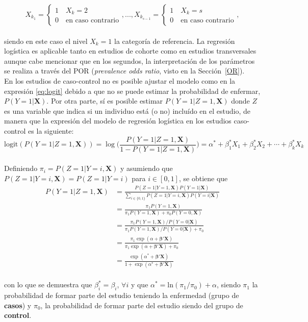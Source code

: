 \begin{equation*}
X_{k_1}= \left\{\begin{array}{l}1 \quad X_k=2\\0 \quad \text{en caso contrario}\end{array}\right., ... , X_{k_{s-1}}=\left\{\begin{array}{l}1 \quad X_k=s\\0 \quad \text{en caso contrario}\end{array}\right.,
\end{equation*}
 \\
siendo en este caso el nivel $X_k=1$ la categoría de referencia.
\newpage
La regresión logística es aplicable tanto en estudios de cohorte como en estudios transversales aunque cabe mencionar que en los segundos, la interpretación de los parámetros se realiza a través del POR (\textit{prevalence odds ratio}, visto en la Sección~\ref{OR}).\\

En los estudios de caso-control no es posible ajustar el modelo como en la expresión \eqref{eq:logit} debido a que no se puede estimar la probabilidad de enfermar, $P(Y=1|\boldsymbol{X})$. Por otra parte, sí es posible estimar $P(Y=1|Z=1,\boldsymbol{X})$ donde $Z$ es una variable que indica si un individuo está (o no) incluído en el estudio, de manera que la expresión del modelo de regresión logística en los estudios caso-control es la siguiente:\\
\begin{equation*}
\text{logit}(P(Y=1|Z=1,\boldsymbol{X}))=\log\Big(\frac{P(Y=1|Z=1,\boldsymbol{X})}{1-P(Y=1|Z=1,\boldsymbol{X})}\Big)=\alpha^*+\beta_1^*X_1+\beta^*_2X_2+\cdots+\beta^*_kX_k
\end{equation*}
\\[0.2cm]
Definiendo $\pi_i=P(Z=1|Y=i,\boldsymbol{X})$ y asumiendo que $P(Z=1|Y=i,\boldsymbol{X})=P(Z=1|Y=i)$ para $i \in [0,1]$, se obtiene que
\begin{align*}
P(Y=1|Z=1,\boldsymbol{X})
&=\frac{P(Z=1|Y=1,\boldsymbol{X})P(Y=1|\boldsymbol{X})}{\sum_{i \in \{0,1\}}P(Z=1|Y=i,\boldsymbol{X})P(Y=i|\boldsymbol{X})} \\[1.8ex]
&=\frac{\pi_1 P(Y=1,\boldsymbol{X})}{\pi_1 P(Y=1,\boldsymbol{X})+\pi_0 P(Y=0,\boldsymbol{X})} \\[1.8ex]
&=\frac{\pi_1 P(Y=1,\boldsymbol{X})/P(Y=0|\boldsymbol{X})}{\pi_1 P(Y=1,\boldsymbol{X})/ P(Y=0|\boldsymbol{X}) + \pi_0} \\[1.8ex]
&=\frac{\pi_1 \exp(\alpha + \boldsymbol{\beta'X})}{\pi_1 \exp(\alpha + \boldsymbol{\beta'X}) + \pi_0} \\[1.8ex]
&=\frac{\exp(\alpha^{*} + \boldsymbol{\beta'X})}{1+\exp(\alpha^{*} + \boldsymbol{\beta'X})}
\end{align*}\\
con lo que se demuestra que $\beta^{*}_i=\beta_i$, $\forall i$ y que $\alpha^{*}=\text{ln}(\pi_1/\pi_0)+\alpha$, siendo $\pi_1$ la probabilidad de formar parte del estudio teniendo la enfermedad (grupo de \textbf{casos}) y $\pi_0$, la probabilidad de formar parte del estudio siendo del grupo de \textbf{control}.\\

